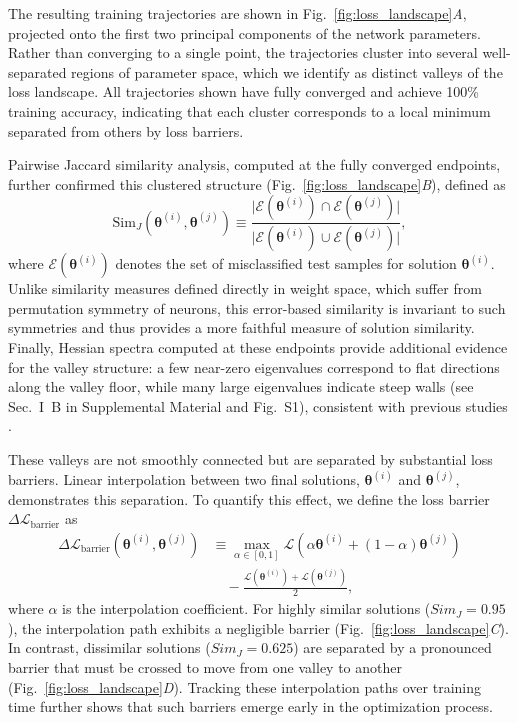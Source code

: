 \documentclass[aps,prx,reprint,superscriptaddress,longbibliography,nofootinbib,floatfix]{revtex4-2}
\begin{document}
The resulting training trajectories are shown in Fig.~\ref{fig:loss_landscape}\textit{A}, projected onto the first two principal components of the network parameters. Rather than converging to a single point, the trajectories cluster into several well-separated regions of parameter space, which we identify as distinct valleys of the loss landscape. All trajectories shown have fully converged and achieve 100\% training accuracy, indicating that each cluster corresponds to a local minimum separated from others by loss barriers.

Pairwise Jaccard similarity analysis, computed at the fully converged endpoints, further confirmed this clustered structure (Fig.~\ref{fig:loss_landscape}\textit{B}), defined as  
\begin{equation}
\mathrm{Sim}_J(\bm{\theta}^{(i)}, \bm{\theta}^{(j)}) \equiv
\frac{ \bigl|\mathcal{E}(\bm{\theta}^{(i)}) \cap \mathcal{E}(\bm{\theta}^{(j)})\bigr| }
     { \bigl|\mathcal{E}(\bm{\theta}^{(i)}) \cup \mathcal{E}(\bm{\theta}^{(j)})\bigr| },
\end{equation}  
where $\mathcal{E}(\bm{\theta}^{(i)})$ denotes the set of misclassified test samples for solution $\bm{\theta}^{(i)}$. Unlike similarity measures defined directly in weight space, which suffer from permutation symmetry of neurons, this error-based similarity is invariant to such symmetries and thus provides a more faithful measure of solution similarity. Finally, Hessian spectra computed at these endpoints provide additional evidence for the valley structure: a few near-zero eigenvalues correspond to flat directions along the valley floor, while many large eigenvalues indicate steep walls (see Sec.~I~B in Supplemental Material and Fig.~S1), consistent with previous studies \cite{wuHowSGDSelects2018,ghorbaniInvestigationNeuralNet2019,chaudhariEntropySGDBiasingGradient2019}.

These valleys are not smoothly connected but are separated by substantial loss barriers. Linear interpolation between two final solutions, $\bm{\theta}^{(i)}$ and $\bm{\theta}^{(j)}$, demonstrates this separation. To quantify this effect, we define the loss barrier $\Delta \mathcal{L}_\mathrm{barrier}$ as
\begin{equation}
\begin{split}
\Delta \mathcal{L}_\mathrm{barrier}(\bm{\theta}^{(i)}, \bm{\theta}^{(j)}) 
&\equiv \max_{\alpha \in [0,1]} 
   \mathcal{L}\!\left(\alpha \bm{\theta}^{(i)} + (1-\alpha)\bm{\theta}^{(j)}\right)  \\[6pt]
&\quad - \frac{\mathcal{L}(\bm{\theta}^{(i)}) + \mathcal{L}(\bm{\theta}^{(j)})}{2},
\end{split}
\end{equation}
where $\alpha$ is the interpolation coefficient. For highly similar solutions ($Sim_J=0.95$), the interpolation path exhibits a negligible barrier (Fig.~\ref{fig:loss_landscape}\textit{C}). In contrast, dissimilar solutions ($Sim_J=0.625$) are separated by a pronounced barrier that must be crossed to move from one valley to another (Fig.~\ref{fig:loss_landscape}\textit{D}). Tracking these interpolation paths over training time further shows that such barriers emerge early in the optimization process. 
\end{document}
